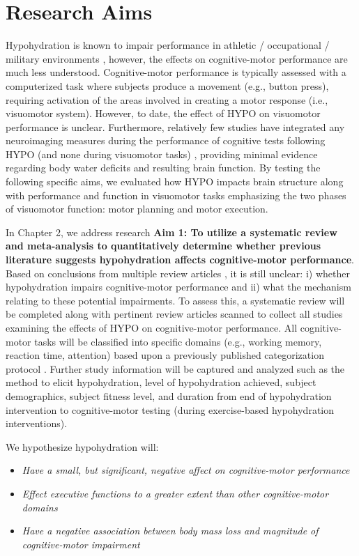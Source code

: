 \section{Research Aims}
Hypohydration is known to impair performance in athletic / occupational / military environments \cite{iom_dietary_2004}, however, the effects on cognitive-motor performance are much less understood. Cognitive-motor performance is typically assessed with a computerized task where subjects produce a movement (e.g., button press), requiring activation of the areas involved in creating a motor response (i.e., visuomotor system). However, to date, the effect of HYPO on visuomotor performance is unclear. Furthermore, relatively few studies have integrated any neuroimaging measures during the performance of cognitive tests following HYPO (and none during visuomotor tasks) \cite{kempton_dehydration_2011,watson_mild_2015,szinnai_effect_2005}, providing minimal evidence regarding body water deficits and resulting brain function. By testing the following specific aims, we evaluated how HYPO impacts brain structure along with performance and function in visuomotor tasks emphasizing the two phases of visuomotor function: motor planning and motor execution. 

In Chapter 2, we address research \textbf{Aim 1: To utilize a systematic review and meta-analysis to quantitatively determine whether previous literature suggests hypohydration affects cognitive-motor performance}. Based on conclusions from multiple review articles \cite{masento_effects_2014,lieberman_hydration_2007,grandjean_dehydration_2007}, it is still unclear: i) whether hypohydration impairs cognitive-motor performance and ii) what the mechanism relating to these potential impairments. To assess this, a systematic review will be completed along with pertinent review articles scanned to collect all studies examining the effects of HYPO on cognitive-motor performance. All cognitive-motor tasks will be classified into specific domains (e.g., working memory, reaction time, attention) based upon a previously published categorization protocol \cite{chang_effects_2012}. Further study information will be captured and analyzed such as the method to elicit hypohydration, level of hypohydration achieved, subject demographics, subject fitness level, and duration from end of hypohydration intervention to cognitive-motor testing (during exercise-based hypohydration interventions). 

We hypothesize hypohydration will:
\begin{itemize}
	\item \textit{Have a small, but significant, negative affect on cognitive-motor performance}
	\item \textit{Effect executive functions to a greater extent than other cognitive-motor domains}
	\item \textit{Have a negative association between body mass loss and magnitude of cognitive-motor impairment}
\end{itemize}
	
